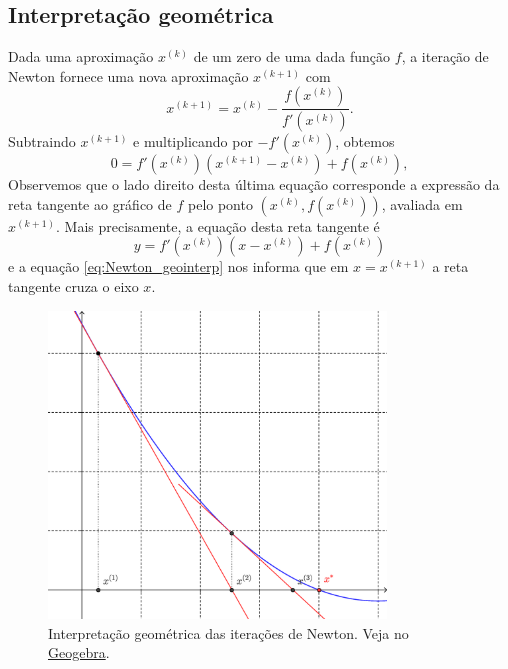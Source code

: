 \subsection{Interpretação geométrica}

Dada uma aproximação $x^{(k)}$ de um zero de uma dada função $f$, a iteração de Newton fornece uma nova aproximação $x^{(k+1)}$ com
\begin{equation}
  x^{(k+1)} = x^{(k)} - \frac{f(x^{(k)})}{f'(x^{(k)})}.
\end{equation}
Subtraindo $x^{(k+1)}$ e multiplicando por $-f'(x^{(k)})$, obtemos
\begin{equation}\label{eq:Newton_geointerp}
  0 = f'(x^{(k)})(x^{(k+1)}-x^{(k)}) + f(x^{(k)}),
\end{equation}
Observemos que o lado direito desta última equação corresponde a expressão da reta tangente ao gráfico de $f$ pelo ponto $(x^{(k)}, f(x^{(k)}))$, avaliada em $x^{(k+1)}$. Mais precisamente, a equação desta reta tangente é
\begin{equation}
  y = f'(x^{(k)})(x-x^{(k)}) + f(x^{(k)})
\end{equation}
e a equação \eqref{eq:Newton_geointerp} nos informa que em $x=x^{(k+1)}$ a reta tangente cruza o eixo $x$.

\begin{figure}[h!]
  \centering
  \includegraphics[width=0.8\textwidth]{./cap_eq1d/dados/fig_Newton_geointerp/fig_Newton_geointerp}
  \caption{Interpretação geométrica das iterações de Newton. Veja no \href{https://github.com/phkonzen/notas/blob/master/src/MatematicaNumerica/cap_eq1d/dados/fig_Newton_geointerp/fig_Newton_geointerp.ggb}{Geogebra}.}
  \label{fig:Newton_geointerp}
\end{figure}


